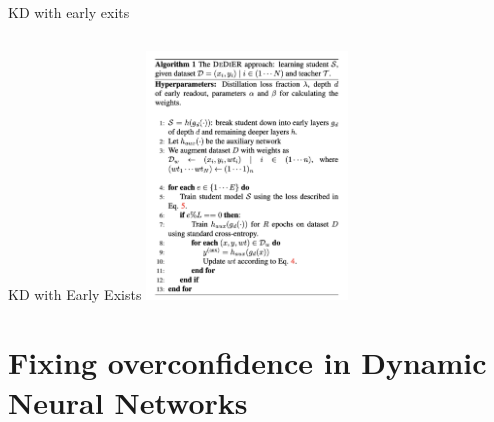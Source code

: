 \documentclass[aspectratio=169,xcolor=dvipsnames]{beamer}
\begin{document}
\begin{frame}{KD with early exits}
\begin{columns}
\begin{column}{0.7\textwidth}
        \end{column}
    \end{columns}
    
\end{frame}

\begin{frame} {KD with Early Exists}
    \includegraphics[width=0.4\textwidth]{figs/fig_9.png}
\end{frame}



\section{Fixing overconfidence in Dynamic Neural Networks}
\end{document}
